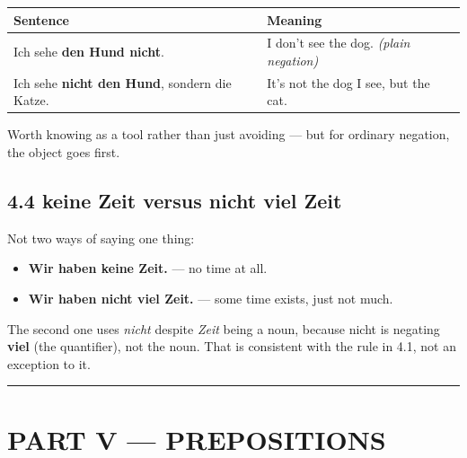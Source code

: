 \documentclass[
  11pt,
]{article}
\newcounter{none} %
\providecommand{\tightlist}{%
  \setlength{\itemsep}{0pt}\setlength{\parskip}{0pt}}
\begin{document}
{\def\LTcaptype{none} %
\begin{longtable}[]{@{}
  >{\raggedright\arraybackslash}p{}
  >{\raggedright\arraybackslash}p{}@{}}
\toprule\noalign{}
\begin{minipage}[b]{\linewidth}\raggedright
Sentence
\end{minipage} & \begin{minipage}[b]{\linewidth}\raggedright
Meaning
\end{minipage} \\
\midrule\noalign{}
\endhead
\bottomrule\noalign{}
\endlastfoot
Ich sehe \textbf{den Hund nicht}. & I don't see the dog. \emph{(plain
negation)} \\
Ich sehe \textbf{nicht den Hund}, sondern die Katze. & It's not the dog
I see, but the cat. \\
\end{longtable}
}

Worth knowing as a tool rather than just avoiding --- but for ordinary
negation, the object goes first.

\subsection{4.4 keine Zeit versus nicht viel
Zeit}\label{keine-zeit-versus-nicht-viel-zeit}

Not two ways of saying one thing:

\begin{itemize}
\tightlist
\item
  \textbf{Wir haben keine Zeit.} --- no time at all.
\item
  \textbf{Wir haben nicht viel Zeit.} --- some time exists, just not
  much.
\end{itemize}

The second one uses \emph{nicht} despite \emph{Zeit} being a noun,
because nicht is negating \textbf{viel} (the quantifier), not the noun.
That is consistent with the rule in 4.1, not an exception to it.

\begin{center}\rule{0.5\linewidth}{0.5pt}\end{center}

\section{PART V --- PREPOSITIONS}\label{part-v-prepositions}
\end{document}
